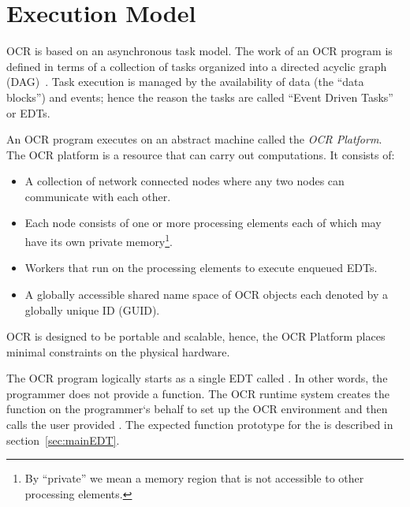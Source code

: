 %

\section{Execution Model}
\label{sec:ExecutionModel}

OCR is based on an asynchronous task model. The work of an OCR program
is defined in terms of a collection of tasks  organized
into a directed acyclic graph (DAG)~\cite{TaSa11,Tasirlar11,Zuckerman:2011:UCP:2000417.2000424}.
Task execution is managed by the availability of data (the ``data
blocks'') and events; hence the reason the tasks are called ``Event
Driven Tasks'' or EDTs.

An OCR program executes on an abstract machine called the \emph{OCR
Platform}. The OCR platform is a resource that can carry out
computations. It consists of:
\begin{itemize}
\item A collection of network connected nodes where any two nodes can
communicate with each other.
\item Each node consists of one or more processing elements each of
which may have its own private memory\footnote{By ``private'' we mean a
memory region that is not accessible to other processing
elements.}.
\item Workers that run on the processing elements to execute enqueued EDTs.
\item A globally accessible shared name space of OCR objects each
denoted by a globally unique ID (GUID).
\end{itemize}
OCR is designed to be portable and scalable, hence, the OCR Platform
places minimal constraints on the physical hardware.

%
%

The OCR program logically starts as a single EDT called .
In other words, the programmer does not provide a  function.
The OCR runtime system creates the  function on the programmer`s
behalf to set up the OCR environment and then calls the user provided
. The expected function prototype for the
 is described in section~\ref{sec:mainEDT}.

